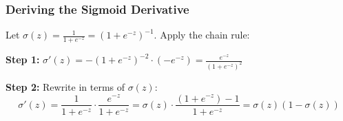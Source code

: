\documentclass[notes,11pt, aspectratio=169]{beamer}
\begin{document}
\begin{frame}
\frametitle{Deriving the Sigmoid Derivative}

Let $\sigma(z) = \frac{1}{1 + e^{-z}} = (1 + e^{-z})^{-1}$. Apply the chain rule:

\vspace{2pt}
\textbf{Step 1:}
$\sigma'(z) = -(1 + e^{-z})^{-2} \cdot (-e^{-z}) = \frac{e^{-z}}{(1 + e^{-z})^2}$

\vspace{4pt}
\textbf{Step 2:} Rewrite in terms of $\sigma(z)$:
\[
    \sigma'(z) = \frac{1}{1+e^{-z}} \cdot \frac{e^{-z}}{1+e^{-z}} = \sigma(z) \cdot \frac{(1 + e^{-z}) - 1}{1+e^{-z}} = \sigma(z)(1 - \sigma(z))
\]

\end{frame}
\end{document}
